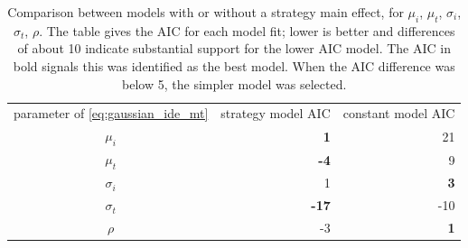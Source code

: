 \documentclass[acmlarge, manuscript,review]{acmart}
\begin{document}
\begin{table}[htbp]
	\centering
	\caption{Comparison between models with or without a strategy main effect, for $\mu_i$, $\mu_t$, $\sigma_i$, $\sigma_t$, $\rho$. The table gives the AIC for each model fit; lower is better and differences of about 10 indicate substantial support for the lower AIC model. The AIC in bold signals this was identified as the best model. When the AIC difference was below 5, the simpler model was selected.}
	\label{tab:aic_gop}
	\begin{tabular}{c rr}
	parameter of \autoref{eq:gaussian_ide_mt}	 & strategy model AIC & constant model AIC\\
	$\mu_i$ &  \textbf{1} & 21 \\
	$\mu_t$ & \textbf{-4} & 9 \\
	$\sigma_i$ & 1 & \textbf{3} \\
	$\sigma_t$ & \textbf{-17} & -10 \\
	$\rho$ &  -3& \textbf{1} \\
	\end{tabular}
\end{table}
\end{document}
